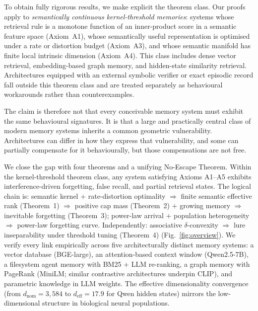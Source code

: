\documentclass[11pt]{article}
\begin{document}
To obtain fully rigorous results, we make explicit the theorem class. Our proofs apply to \textit{semantically continuous kernel-threshold memories}: systems whose retrieval rule is a monotone function of an inner-product score in a semantic feature space (Axiom~A1), whose semantically useful representation is optimised under a rate or distortion budget (Axiom~A3), and whose semantic manifold has finite local intrinsic dimension (Axiom~A4). This class includes dense vector retrieval, embedding-based graph memory, and hidden-state similarity retrieval. Architectures equipped with an external symbolic verifier or exact episodic record fall outside this theorem class and are treated separately as behavioural workarounds rather than counterexamples.

The claim is therefore not that every conceivable memory system must exhibit the same behavioural signatures. It is that a large and practically central class of modern memory systems inherits a common geometric vulnerability. Architectures can differ in how they express that vulnerability, and some can partially compensate for it behaviourally, but those compensations are not free.

We close the gap with four theorems and a unifying No-Escape Theorem. Within the kernel-threshold theorem class, any system satisfying Axioms A1--A5 exhibits interference-driven forgetting, false recall, and partial retrieval states. The logical chain is: semantic kernel $+$ rate-distortion optimality $\Rightarrow$ finite semantic effective rank (Theorem~1) $\Rightarrow$ positive cap mass (Theorem~2) $+$ growing memory $\Rightarrow$ inevitable forgetting (Theorem~3); power-law arrival $+$ population heterogeneity $\Rightarrow$ power-law forgetting curve. Independently: associative $\delta$-convexity $\Rightarrow$ lure inseparability under threshold tuning (Theorem~4) (Fig.~\ref{fig:overview}). We verify every link empirically across five architecturally distinct memory systems: a vector database (BGE-large\cite{xiao2023}), an attention-based context window (Qwen2.5-7B\cite{qwen2024}), a filesystem agent memory with BM25 $+$ LLM re-ranking, a graph memory with PageRank (MiniLM\cite{reimers2019}; similar contrastive architectures underpin CLIP\cite{radford2021}), and parametric knowledge in LLM weights. The effective dimensionality convergence (from $d_\text{nom} = 3{,}584$ to $d_\text{eff} = 17.9$ for Qwen hidden states) mirrors the low-dimensional structure in biological neural populations\cite{stringer2019,gao2017}.
\end{document}
